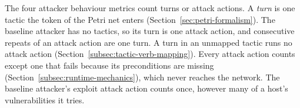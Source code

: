 \documentclass{cshonours}
\begin{document}
The four attacker behaviour metrics count turns or attack actions. A \emph{turn} is one tactic
the token of the Petri net enters (Section~\ref{sec:petri-formalism}). The
baseline attacker has no tactics, so its turn is one attack action, and
consecutive repeats of an attack action are one turn. A turn in an unmapped
tactic runs no attack action (Section~\ref{subsec:tactic-verb-mapping}).
Every attack action counts except one that fails because its preconditions
are missing (Section~\ref{subsec:runtime-mechanics}), which never reaches the
network. The baseline attacker's exploit attack action counts once, however
many of a host's vulnerabilities it tries.
\end{document}
